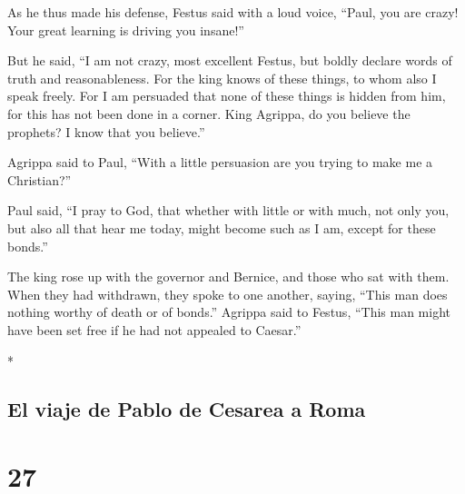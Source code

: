 \begin{paracol}{2}
\begin{otherlanguage}{english}
 As he thus made his defense, Festus said with a loud
voice, ``Paul, you are crazy! Your great learning is driving you
insane!''

 But he said, ``I am not crazy, most excellent Festus,
but boldly declare words of truth and reasonableness. 
For the king knows of these things, to whom also I speak freely. For I
am persuaded that none of these things is hidden from him, for this has
not been done in a corner.  King Agrippa, do you believe
the prophets? I know that you believe.''

 Agrippa said to Paul, ``With a little persuasion are you
trying to make me a Christian?''

 Paul said, ``I pray to God, that whether with little or
with much, not only you, but also all that hear me today, might become
such as I am, except for these bonds.''

 The king rose up with the governor and Bernice, and
those who sat with them.  When they had withdrawn, they
spoke to one another, saying, ``This man does nothing worthy of death or
of bonds.''  Agrippa said to Festus, ``This man might
have been set free if he had not appealed to Caesar.''

\end{otherlanguage}

\switchcolumn[0]*

\hypertarget{el-viaje-de-pablo-de-cesarea-a-roma}{%
\subsection{El viaje de Pablo de Cesarea a
Roma}\label{el-viaje-de-pablo-de-cesarea-a-roma}}

\hypertarget{section-52}{%
\section{27}\label{section-52}}


\end{paracol}
